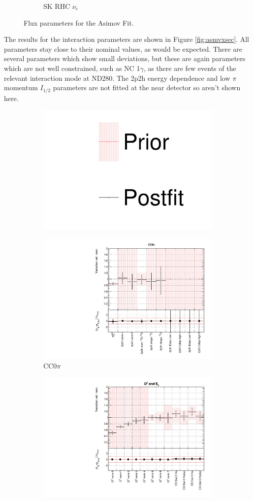 \begin{figure}
\begin{subfigure}{0.24\textwidth}
  \caption{SK RHC $\nu_e$}
\end{subfigure}
\caption{Flux parameters for the Asimov Fit.}
\label{fig:asmvfluxSK}
\end{figure}

The results for the interaction parameters are shown in Figure \ref{fig:asmvxsec}. All parameters stay close to their nominal values, as would be expected. There are several parameters which show small deviations, but these are again parameters which are not well constrained, such as NC 1$\gamma$, as there are few events of the relevant interaction mode at ND280. The 2p2h energy dependence and low $\pi$ momentum $I_{1/2}$ parameters are not fitted at the near detector so aren't shown here.

\begin{figure}
\centering
\begin{subfigure}{0.95\textwidth}
  \centering
  \includegraphics[width=0.25\linewidth]{figs/asmv_leg}
\end{subfigure}
\begin{subfigure}{0.49\textwidth}
  \centering
  \includegraphics[width=0.9\linewidth]{figs/asmvxsec1}
  \caption{CC0$\pi$}
\end{subfigure}
\begin{subfigure}{0.49\textwidth}
  \centering
  \includegraphics[width=0.9\linewidth]{figs/asmvxsec2}

\end{subfigure}
\end{figure}
